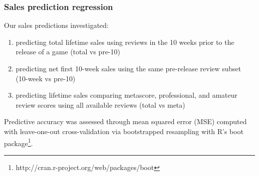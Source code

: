 \documentclass{sig-alternate}
\begin{document}
\subsubsection{Sales prediction regression}
Our sales predictions investigated: 
\begin{enumerate}
\item predicting total lifetime sales using reviews in the 10 weeks prior to the release of a game (total vs pre-10)
\item predicting net first 10-week sales using the same pre-release review subset (10-week vs pre-10)
\item predicting lifetime sales comparing metascore, professional, and amateur review scores using all available reviews (total vs meta)
\end{enumerate}
Predictive accuracy was assessed through mean squared error (MSE)
computed with leave-one-out cross-validation via bootstrapped resampling with R's boot package\footnote{http://cran.r-project.org/web/packages/boot}.
\end{document}
